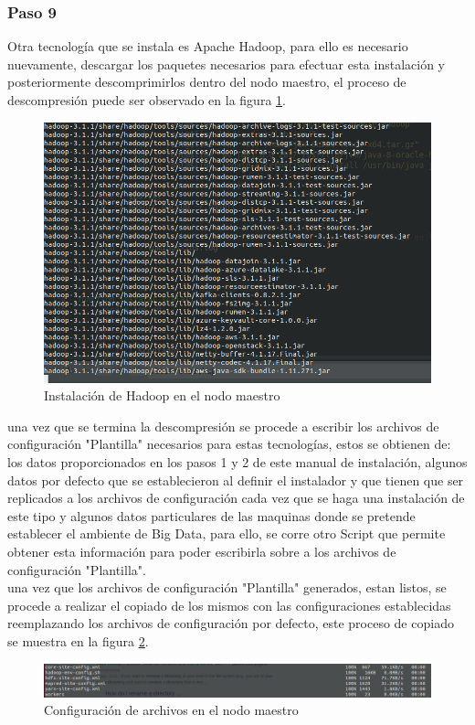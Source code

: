 \subsubsection{Paso 9}
Otra tecnología que se instala es Apache Hadoop, para ello es necesario nuevamente, descargar los paquetes necesarios para efectuar esta instalación y posteriormente descomprimirlos dentro del nodo maestro, el proceso de descompresión puede ser observado en la figura \ref{fig:hadoopmaestro}.
\\
\begin{figure}[H]
	\hypertarget{fig:hadoopmaestro}{\hspace{1pt}}
	\begin{center}	
		\includegraphics[width=.7\textwidth]{capitulo5/images/instalacionhadoopmaestro.png}
		\caption{Instalación de Hadoop en el nodo maestro}
		\label{fig:hadoopmaestro}
	\end{center}
\end{figure}
una vez que se termina la descompresión se procede a escribir los archivos de configuración "Plantilla" necesarios para estas tecnologías, estos se obtienen de: los datos proporcionados en los pasos 1 y 2 de este manual de instalación, algunos datos por defecto que se establecieron al definir el instalador y que tienen que ser replicados a los archivos de configuración cada vez que se haga una instalación de este tipo y algunos datos particulares de las maquinas donde se pretende establecer el ambiente de Big Data, para ello, se corre otro Script que permite obtener esta información para poder escribirla sobre a los archivos de configuración "Plantilla".
\\
una vez que los archivos de configuración "Plantilla" generados, estan listos, se procede a realizar el copiado de los mismos con las configuraciones establecidas reemplazando los archivos de configuración por defecto, este proceso de copiado se muestra en la figura \ref{fig:copiado}.
\begin{figure}[H]
	\hypertarget{fig:copiado}{\hspace{1pt}}
	\begin{center}	
		\includegraphics[width=.7\textwidth]{capitulo5/images/configuracionhadoopesclavo.png}
		\caption{Configuración de archivos en el nodo maestro}
		\label{fig:copiado}
	\end{center}
\end{figure}
